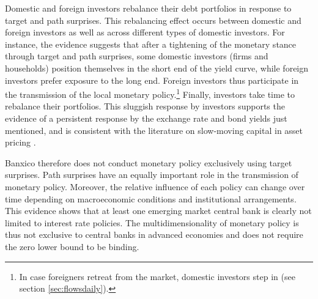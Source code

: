 \documentclass[a4paper, 12pt]{article}
\begin{document}
Domestic and foreign investors rebalance their debt portfolios in response to target and path surprises. This rebalancing effect occurs between domestic and foreign investors as well as across different types of domestic investors. For instance, the evidence suggests that after a tightening of the monetary stance through target and path surprises, some domestic investors (firms and households) position themselves in the short end of the yield curve, while foreign investors prefer exposure to the long end.
Foreign investors thus participate in the transmission of the local monetary policy.\footnote{In case foreigners retreat from the market, domestic investors step in (see section \ref{sec:flowsdaily}).} 
Finally, investors take time to rebalance their portfolios. This sluggish response by investors supports the evidence of a persistent response by the exchange rate and bond yields just mentioned, and is consistent with the literature on slow-moving capital in asset pricing \parencite{Duffie:2010}. 

Banxico therefore does not conduct monetary policy exclusively using target surprises. Path surprises have an equally important role in the transmission of monetary policy. Moreover, the relative influence of each policy can change over time depending on macroeconomic conditions and institutional arrangements. This evidence shows that at least one emerging market central bank is clearly not limited to interest rate policies. 
The multidimensionality of monetary policy \parencite{GSS:2005a,Altavillaetal:2019,Swanson:2021} is thus not exclusive to central banks in advanced economies and does not require the zero lower bound to be binding.
\end{document}
